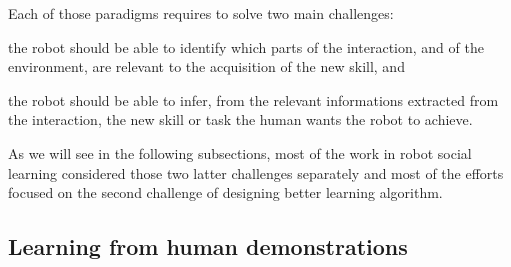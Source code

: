 Each of those paradigms requires to solve two main challenges: \begin{inparaenum}[(1)] \item the robot should be able to identify which parts of the interaction, and of the environment, are relevant to the acquisition of the new skill, and \item the robot should be able to infer, from the relevant informations extracted from the interaction, the new skill or task the human wants the robot to achieve. \end{inparaenum}

As we will see in the following subsections, most of the work in robot social learning considered those two latter challenges separately and most of the efforts focused on the second challenge of designing better learning algorithm.



\subsection{Learning from human demonstrations}

